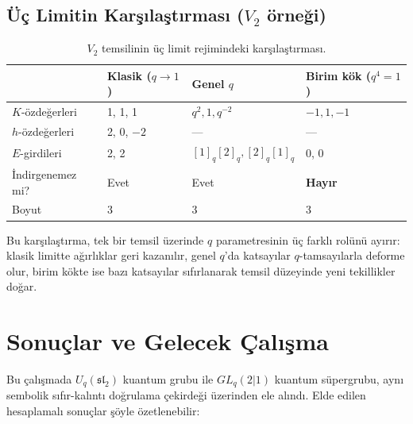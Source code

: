 \documentclass[10pt]{math}
\numberwithin{equation}{section}
\theoremstyle{plain}
\theoremstyle{definition}
\renewcommand{\sl}{\mathfrak{sl}}
\newcommand{\Uq}{U_q(\sl_2)}
\newcommand{\qint}[1]{[#1]_q}
\begin{document}
\subsection{Üç Limitin Karşılaştırması ($V_2$ örneği)}

\begin{table}[h]
\centering
\small
\caption{$V_2$ temsilinin üç limit rejimindeki karşılaştırması.}
\label{tab:limits}
\begin{tabularx}{\textwidth}{@{}lXXX@{}}
\toprule
& Klasik ($q \to 1$) & Genel $q$ & Birim kök ($q^4 = 1$) \\
\midrule
$K$-özdeğerleri & 1, 1, 1 & $q^2, 1, q^{-2}$ & $-1, 1, -1$ \\
$h$-özdeğerleri & 2, 0, $-2$ & --- & --- \\
$E$-girdileri & 2, 2 & $\qint{1}\qint{2}, \qint{2}\qint{1}$ & 0, 0 \\
İndirgenemez mi? & Evet & Evet & \textbf{Hayır} \\
Boyut & 3 & 3 & 3 \\
\bottomrule
\end{tabularx}
\end{table}

Bu karşılaştırma, tek bir temsil üzerinde $q$ parametresinin üç farklı rolünü
ayırır: klasik limitte ağırlıklar geri kazanılır, genel $q$'da katsayılar
$q$-tamsayılarla deforme olur, birim kökte ise bazı katsayılar sıfırlanarak
temsil düzeyinde yeni tekillikler doğar.

\section{Sonuçlar ve Gelecek Çalışma}

Bu çalışmada $\Uq$ kuantum grubu ile $GL_q(2|1)$ kuantum süpergrubu, aynı
sembolik sıfır-kalıntı doğrulama çekirdeği üzerinden ele alındı. Elde edilen
hesaplamalı sonuçlar şöyle özetlenebilir:
\end{document}
